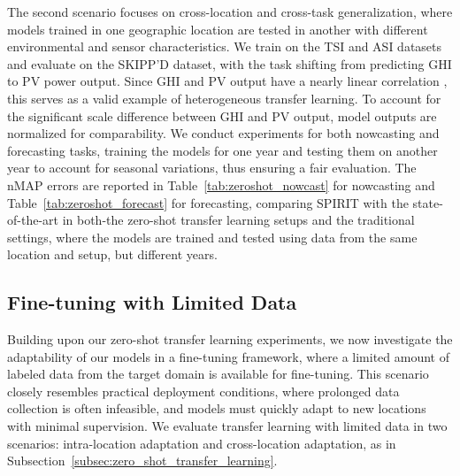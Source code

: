 The second scenario focuses on cross-location and cross-task generalization, where models trained in one geographic location are tested in another with different environmental and sensor characteristics. We train on the TSI and ASI datasets and evaluate on the SKIPP'D dataset, with the task shifting from predicting GHI to PV power output. Since GHI and PV output have a nearly linear correlation \cite{ghi_pv_linear}, this serves as a valid example of heterogeneous transfer learning. To account for the significant scale difference between GHI and PV output, model outputs are normalized for comparability. We conduct experiments for both nowcasting and forecasting tasks, training the models for one year and testing them on another year to account for seasonal variations, thus ensuring a fair evaluation. The nMAP errors are reported in Table~\ref{tab:zeroshot_nowcast} for nowcasting and Table~\ref{tab:zeroshot_forecast} for forecasting, comparing SPIRIT with the state-of-the-art in both-the zero-shot transfer learning setups and the traditional settings, where the models are trained and tested using data from the same location and setup, but different years.




\subsection{Fine-tuning with Limited Data}
Building upon our zero-shot transfer learning experiments, we now investigate the adaptability of our models in a fine-tuning framework, where a limited amount of labeled data from the target domain is available for fine-tuning. This scenario closely resembles practical deployment conditions, where prolonged data collection is often infeasible, and models must quickly adapt to new locations with minimal supervision. We evaluate transfer learning with limited data in two scenarios: intra-location adaptation and cross-location adaptation, as in Subsection~\ref{subsec:zero_shot_transfer_learning}.

